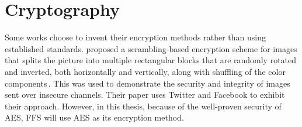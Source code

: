 \section{Cryptography}
\label{sec:rel_crypto}
Some works choose to invent their encryption methods rather than using established standards. \citeauthor{chumanEncryptionThenCompressionSystemsUsing2019} proposed a \mbox{scrambling-based} encryption scheme for images that splits the picture into multiple rectangular blocks that are randomly rotated and inverted, both horizontally and vertically, along with shuffling of the color components\,\cite{chumanEncryptionThenCompressionSystemsUsing2019}. This was used to demonstrate the security and integrity of images sent over insecure channels. Their paper uses Twitter and Facebook to exhibit their approach. However, in this thesis, because of the \mbox{well-proven} security of \gls{AES}, \gls{FFS} will use \gls{AES} as its encryption method.